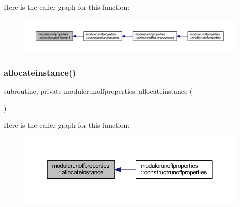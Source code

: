 Here is the caller graph for this function\+:\nopagebreak
\begin{figure}[H]
\begin{center}
\leavevmode
\includegraphics[width=350pt]{namespacemodulerunoffproperties_a6a694f9a334a389bdaca97db0bbc2f7b_icgraph}
\end{center}
\end{figure}
\mbox{\label{namespacemodulerunoffproperties_a41c3c8acac2de4ef4606685a920370db}} 
\subsubsection{\texorpdfstring{allocateinstance()}{allocateinstance()}}
{\footnotesize\ttfamily subroutine, private modulerunoffproperties\+::allocateinstance (\begin{DoxyParamCaption}{ }\end{DoxyParamCaption})\hspace{0.3cm}{\ttfamily [private]}}

Here is the caller graph for this function\+:\nopagebreak
\begin{figure}[H]
\begin{center}
\leavevmode
\includegraphics[width=350pt]{namespacemodulerunoffproperties_a41c3c8acac2de4ef4606685a920370db_icgraph}
\end{center}
\end{figure}
\mbox{\label{namespacemodulerunoffproperties_a2e51076442e9337406704c9d257c24cb}} 
